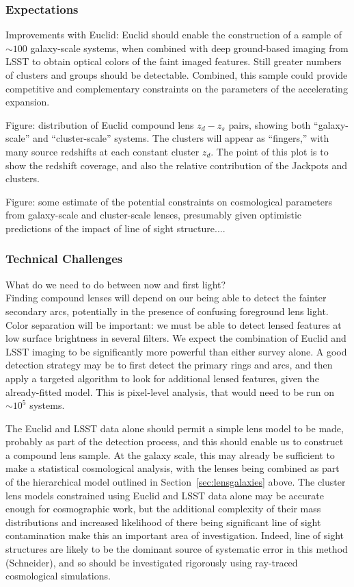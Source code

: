 \documentclass[twocolumn]{svjour3}
\begin{document}
\subsubsection{Expectations}

Improvements with Euclid: Euclid should enable the construction of a
sample of $\sim100$ galaxy-scale systems, when combined with deep
ground-based imaging from LSST to obtain optical colors of the faint
imaged features. Still greater numbers of clusters and groups should be
detectable. Combined, this sample could provide competitive and
complementary constraints on the parameters of the accelerating
expansion.

Figure: distribution of Euclid compound lens $z_d - z_s$ pairs, showing
both ``galaxy-scale'' and ``cluster-scale'' systems. The clusters will
appear as ``fingers,'' with many source redshifts at each constant
cluster $z_d$. The point of this plot is to show the redshift coverage,
and also the relative contribution of the Jackpots and clusters.

Figure: some estimate of the potential constraints on cosmological
parameters from galaxy-scale and cluster-scale lenses, presumably given
optimistic predictions of the impact of line of sight structure....


\subsubsection{Technical Challenges}

What do we need to do between now and first light?\\

Finding compound lenses will depend on our being able to detect the
fainter secondary arcs, potentially in the presence of confusing
foreground lens light. Color separation will be important: we must be
able to detect lensed features at low surface brightness in several
filters. We expect the combination of Euclid and LSST imaging to be
significantly more powerful than either survey alone. A good detection
strategy may be to first detect the primary rings and arcs, and then
apply a targeted algorithm to look for additional lensed features, given
the already-fitted model. This is pixel-level analysis, that would need
to be run on $\sim 10^5$ systems.

The Euclid and LSST data alone should permit a simple lens model to be
made, probably as part of the detection process, and this should enable
us to construct a compound lens sample. At the galaxy scale, this may
already be sufficient to make a statistical cosmological analysis, with
the lenses being combined as part of the hierarchical model outlined in
Section~\ref{sec:lensgalaxies} above. The cluster lens models
constrained using Euclid and LSST data alone may be accurate enough for
cosmographic work, but the additional complexity of their mass
distributions and increased likelihood of there being significant line
of sight contamination make this an important area of investigation.
Indeed, line of sight structures are likely to be the dominant source of
systematic error in this method (Schneider), and so should be
investigated rigorously using ray-traced cosmological simulations.
\end{document}
